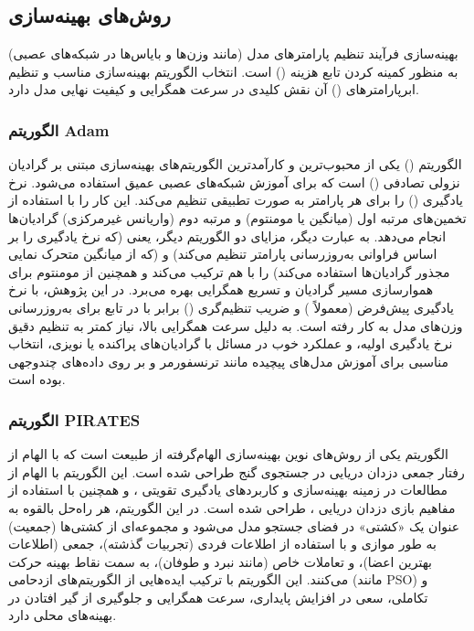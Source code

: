 \subsection{روش‌های بهینه‌سازی}
بهینه‌سازی فرآیند تنظیم پارامترهای مدل (مانند وزن‌ها و بایاس‌ها در شبکه‌های عصبی) به منظور کمینه کردن تابع هزینه () است. انتخاب الگوریتم بهینه‌سازی مناسب و تنظیم ابرپارامترهای () آن نقش کلیدی در سرعت همگرایی و کیفیت نهایی مدل دارد.

\subsubsection{الگوریتم Adam}
الگوریتم  () یکی از محبوب‌ترین و کارآمدترین الگوریتم‌های بهینه‌سازی مبتنی بر گرادیان نزولی تصادفی () است که برای آموزش شبکه‌های عصبی عمیق استفاده می‌شود.  نرخ یادگیری () را برای هر پارامتر به صورت تطبیقی تنظیم می‌کند. این کار را با استفاده از تخمین‌های مرتبه اول (میانگین یا مومنتوم) و مرتبه دوم (واریانس غیرمرکزی) گرادیان‌ها انجام می‌دهد. به عبارت دیگر،  مزایای دو الگوریتم دیگر، یعنی  (که نرخ یادگیری را بر اساس فراوانی به‌روزرسانی پارامتر تنظیم می‌کند) و  (که از میانگین متحرک نمایی مجذور گرادیان‌ها استفاده می‌کند) را با هم ترکیب می‌کند و همچنین از مومنتوم برای هموارسازی مسیر گرادیان و تسریع همگرایی بهره می‌برد.
در این پژوهش،  با نرخ یادگیری پیش‌فرض (معمولاً ) و ضریب تنظیم‌گری  () برابر با  در تابع  برای به‌روزرسانی وزن‌های مدل  به کار رفته است.  به دلیل سرعت همگرایی بالا، نیاز کمتر به تنظیم دقیق نرخ یادگیری اولیه، و عملکرد خوب در مسائل با گرادیان‌های پراکنده یا نویزی، انتخاب مناسبی برای آموزش مدل‌های پیچیده مانند ترنسفورمر و  بر روی داده‌های چندوجهی بوده است.

\subsubsection{الگوریتم PIRATES}
الگوریتم  یکی از روش‌های نوین بهینه‌سازی الهام‌گرفته از طبیعت است که با الهام از رفتار جمعی دزدان دریایی در جستجوی گنج طراحی شده است. این الگوریتم با الهام از مطالعات \cite{Dunning2010} در زمینه بهینه‌سازی و کاربردهای یادگیری تقویتی \cite{LeQuy2023}، و همچنین با استفاده از مفاهیم بازی دزدان دریایی \cite{PirateGame}، طراحی شده است. در این الگوریتم، هر راه‌حل بالقوه به عنوان یک «کشتی» در فضای جستجو مدل می‌شود و مجموعه‌ای از کشتی‌ها (جمعیت) به طور موازی و با استفاده از اطلاعات فردی (تجربیات گذشته)، جمعی (اطلاعات بهترین اعضا)، و تعاملات خاص (مانند نبرد و طوفان)، به سمت نقاط بهینه حرکت می‌کنند. این الگوریتم با ترکیب ایده‌هایی از الگوریتم‌های ازدحامی (مانند PSO) و تکاملی، سعی در افزایش پایداری، سرعت همگرایی و جلوگیری از گیر افتادن در بهینه‌های محلی دارد.

